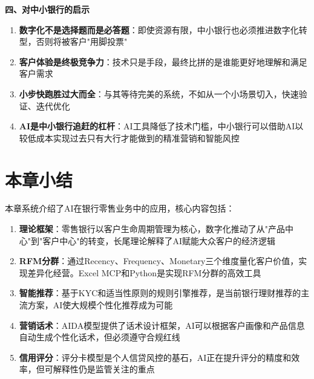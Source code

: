 \begin{casebox}[招商银行智慧零售实践]
\textbf{四、对中小银行的启示}

\begin{enumerate}[leftmargin=2em]
  \item \textbf{数字化不是选择题而是必答题}：即使资源有限，中小银行也必须推进数字化转型，否则将被客户"用脚投票"
  \item \textbf{客户体验是终极竞争力}：技术只是手段，最终比拼的是谁能更好地理解和满足客户需求
  \item \textbf{小步快跑胜过大而全}：与其等待完美的系统，不如从一个小场景切入，快速验证、迭代优化
  \item \textbf{AI是中小银行追赶的杠杆}：AI工具降低了技术门槛，中小银行可以借助AI以较低成本实现过去只有大行才能做到的精准营销和智能风控
\end{enumerate}
\end{casebox}


\section*{本章小结}

本章系统介绍了AI在银行零售业务中的应用，核心内容包括：

\begin{enumerate}[leftmargin=2em]
  \item \textbf{理论框架}：零售银行以客户生命周期管理为核心，数字化推动了从"产品中心"到"客户中心"的转变，长尾理论解释了AI赋能大众客户的经济逻辑
  \item \textbf{RFM分群}：通过Recency、Frequency、Monetary三个维度量化客户价值，实现差异化经营。Excel MCP和Python是实现RFM分群的高效工具
  \item \textbf{智能推荐}：基于KYC和适当性原则的规则引擎推荐，是当前银行理财推荐的主流方案，AI使大规模个性化推荐成为可能
  \item \textbf{营销话术}：AIDA模型提供了话术设计框架，AI可以根据客户画像和产品信息自动生成个性化话术，但必须遵守合规红线
  \item \textbf{信用评分}：评分卡模型是个人信贷风控的基石，AI正在提升评分的精度和效率，但可解释性仍是监管关注的重点
\end{enumerate}


